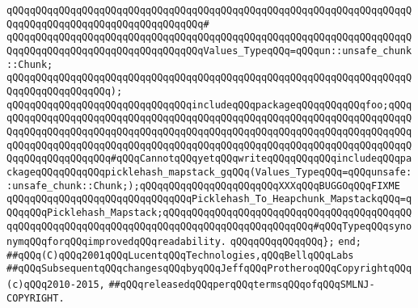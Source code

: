 \verb|qQQqqQQqqQQqqQQqqQQqqQQqqQQqqQQqqQQqqQQqqQQqqQQqqQQqqQQqqQQqqQQqqQQqqQQqqQQqqQQqqQQqqQQqqQQqqQQqqQQqqQQq#|\newline
\verb|qQQqqQQqqQQqqQQqqQQqqQQqqQQqqQQqqQQqqQQqqQQqqQQqqQQqqQQqqQQqqQQqqQQqqQQqqQQqqQQqqQQqqQQqqQQqqQQqqQQqqQQqValues_TypeqQQq=qQQqun::unsafe_chunk::Chunk;|\newline
\verb|qQQqqQQqqQQqqQQqqQQqqQQqqQQqqQQqqQQqqQQqqQQqqQQqqQQqqQQqqQQqqQQqqQQqqQQqqQQqqQQqqQQqqQQq);|\newline
\newline
\verb|qQQqqQQqqQQqqQQqqQQqqQQqqQQqqQQqincludeqQQqpackageqQQqqQQqqQQqfoo;qQQqqQQqqQQqqQQqqQQqqQQqqQQqqQQqqQQqqQQqqQQqqQQqqQQqqQQqqQQqqQQqqQQqqQQqqQQqqQQqqQQqqQQqqQQqqQQqqQQqqQQqqQQqqQQqqQQqqQQqqQQqqQQqqQQqqQQqqQQqqQQqqQQqqQQqqQQqqQQqqQQqqQQqqQQqqQQqqQQqqQQqqQQqqQQqqQQqqQQqqQQqqQQqqQQqqQQqqQQqqQQqqQQqqQQq#qQQqCannotqQQqyetqQQqwriteqQQqqQQqqQQqincludeqQQqpackageqQQqqQQqqQQqpicklehash_mapstack_gqQQq(Values_TypeqQQq=qQQqunsafe::unsafe_chunk::Chunk;);qQQqqQQqqQQqqQQqqQQqqQQqXXXqQQqBUGGOqQQqFIXME|\newline
\newline
\verb|qQQqqQQqqQQqqQQqqQQqqQQqqQQqqQQqPicklehash_To_Heapchunk_MapstackqQQq=qQQqqQQqPicklehash_Mapstack;qQQqqQQqqQQqqQQqqQQqqQQqqQQqqQQqqQQqqQQqqQQqqQQqqQQqqQQqqQQqqQQqqQQqqQQqqQQqqQQqqQQqqQQqqQQqqQQq#qQQqTypeqQQqsynonymqQQqforqQQqimprovedqQQqreadability.|\newline
\verb|qQQqqQQqqQQqqQQq};|\newline
\verb|end;|\newline
\newline
\newline
\verb|##qQQq(C)qQQq2001qQQqLucentqQQqTechnologies,qQQqBellqQQqLabs|\newline
\verb|##qQQqSubsequentqQQqchangesqQQqbyqQQqJeffqQQqProtheroqQQqCopyrightqQQq(c)qQQq2010-2015,|\newline
\verb|##qQQqreleasedqQQqperqQQqtermsqQQqofqQQqSMLNJ-COPYRIGHT.|\newline

